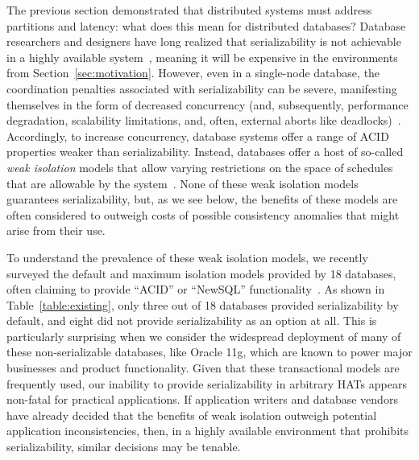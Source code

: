 The previous section demonstrated that distributed systems must
address partitions and latency: what does this mean for distributed
databases? Database researchers and designers have long realized that
serializability is not achievable in a highly available
system~\cite{davidson-survey}, meaning it will be expensive in the
environments from Section~\ref{sec:motivation}. However, even in a
single-node database, the coordination penalties associated with
serializability can be severe, manifesting themselves in the form of
decreased concurrency (and, subsequently, performance degradation,
scalability limitations, and, often, external aborts like
deadlocks)~\cite{gray-isolation}. Accordingly, to increase concurrency,
database systems offer a range of ACID properties weaker than
serializability.  Instead, databases offer a host of so-called
\textit{weak isolation} models that allow varying restrictions on the
space of schedules that are allowable by the system~\cite{adya,
  ansicritique, ansi-sql}. None of these weak isolation models
guarantees serializability, but, as we see below, the benefits of
these models are often considered to outweigh costs of possible
consistency anomalies that might arise from their use.

To understand the prevalence of these weak isolation models, we
recently surveyed the default and maximum isolation models provided by
18 databases, often claiming to provide ``ACID'' or ``NewSQL''
functionality~\cite{hat-hotos}. As shown in
Table~\ref{table:existing}, only three out of 18 databases provided
serializability by default, and eight did not provide serializability
as an option at all. This is particularly surprising when we consider
the widespread deployment of many of these non-serializable databases,
like Oracle 11g, which are known to power major businesses and product
functionality. Given that these transactional models are frequently
used, our inability to provide serializability in arbitrary HATs
appears non-fatal for practical applications. If application writers
and database vendors have already decided that the benefits of weak
isolation outweigh potential application inconsistencies, then, in a
highly available environment that prohibits serializability, similar
decisions may be tenable.

